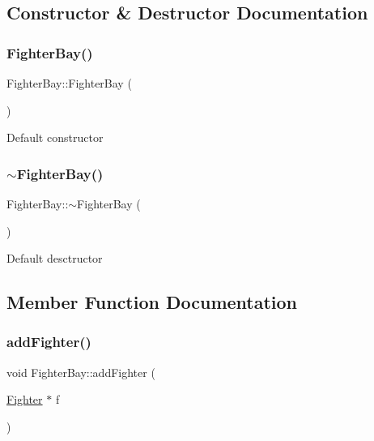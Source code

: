 \subsection{Constructor \& Destructor Documentation}
\mbox{\label{classFighterBay_a7a2ab5524457936b01bbf98cd717ac91}} 
\subsubsection{\texorpdfstring{Fighter\+Bay()}{FighterBay()}}
{\footnotesize\ttfamily Fighter\+Bay\+::\+Fighter\+Bay (\begin{DoxyParamCaption}{ }\end{DoxyParamCaption})\hspace{0.3cm}{\ttfamily [inline]}}

Default constructor \mbox{\label{classFighterBay_aa037d013b598d478aa4314c16081cfc1}} 
\subsubsection{\texorpdfstring{$\sim$\+Fighter\+Bay()}{~FighterBay()}}
{\footnotesize\ttfamily Fighter\+Bay\+::$\sim$\+Fighter\+Bay (\begin{DoxyParamCaption}{ }\end{DoxyParamCaption})\hspace{0.3cm}{\ttfamily [inline]}}

Default desctructor 

\subsection{Member Function Documentation}
\mbox{\label{classFighterBay_a24764deae3987f30be8825c7673b90a0}} 
\subsubsection{\texorpdfstring{add\+Fighter()}{addFighter()}}
{\footnotesize\ttfamily void Fighter\+Bay\+::add\+Fighter (\begin{DoxyParamCaption}\item[{\hyperlink{classFighter}{Fighter} $\ast$}]{f }\end{DoxyParamCaption})}

